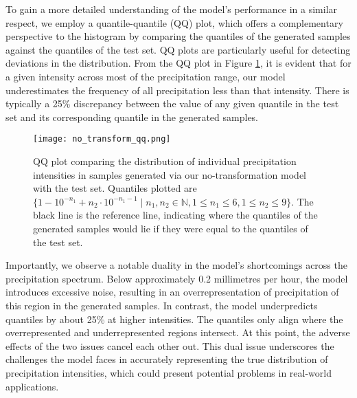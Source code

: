 \documentclass[ oneside,%
                    author={George Herbert},
                    degree={MSci},
                     title={Video Diffusion Models for Climate Simulations},
                  subtitle={}]{dissertation}
\begin{document}
To gain a more detailed understanding of the model's performance in a similar respect, we employ a quantile-quantile (QQ) plot, which offers a complementary perspective to the histogram by comparing the quantiles of the generated samples against the quantiles of the test set. QQ plots are particularly useful for detecting deviations in the distribution. From the QQ plot in Figure \ref{fig:no_transform_qq}, it is evident that for a given intensity across most of the precipitation range, our model underestimates the frequency of all precipitation less than that intensity. There is typically a 25\% discrepancy between the value of any given quantile in the test set and its corresponding quantile in the generated samples.

\begin{figure}[htbp]
      \centering
      \texttt{[image: no\_transform\_qq.png]}
      \caption{QQ plot comparing the distribution of individual precipitation intensities in samples generated via our no-transformation model with the test set. Quantiles plotted are $\{1 - 10^{-n_1} + n_2 \cdot 10^{-n_1 - 1}\mid n_1,n_2\in \mathbb{N}, 1 \le n_1 \le 6, 1 \le n_2 \le 9\}$. The black line is the reference line, indicating where the quantiles of the generated samples would lie if they were equal to the quantiles of the test set.}
      \label{fig:no_transform_qq}
\end{figure}

Importantly, we observe a notable duality in the model's shortcomings across the precipitation spectrum. Below approximately 0.2 millimetres per hour, the model introduces excessive noise, resulting in an overrepresentation of precipitation of this region in the generated samples. In contrast, the model underpredicts quantiles by about 25\% at higher intensities. The quantiles only align where the overrepresented and underrepresented regions intersect. At this point, the adverse effects of the two issues cancel each other out. This dual issue underscores the challenges the model faces in accurately representing the true distribution of precipitation intensities, which could present potential problems in real-world applications.
\end{document}
